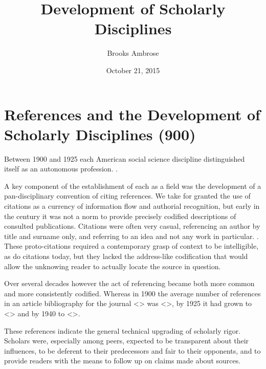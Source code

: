 \documentclass[]{article}
\title{Development of Scholarly Disciplines}
\author{Brooks Ambrose}
\date{October 21, 2015}
\begin{document}
\maketitle

{
\setcounter{tocdepth}{2}
\tableofcontents
}
\section{References and the Development of Scholarly Disciplines
(900)}\label{references-and-the-development-of-scholarly-disciplines-900}

Between 1900 and 1925 each American social science discipline
distinguished itself as an autonomous profession. .

A key component of the establishment of each as a field was the
development of a pan-disciplinary convention of citing references. We
take for granted the use of citations as a currency of information flow
and authorial recognition, but early in the century it was not a norm to
provide precisely codified descriptions of consulted publications.
Citations were often very casual, referencing an author by title and
surname only, and referring to an idea and not any work in particular. .
These proto-citations required a contemporary grasp of context to be
intelligible, as do citations today, but they lacked the address-like
codification that would allow the unknowing reader to actually locate
the source in question.

Over several decades however the act of referencing became both more
common and more consistently codified. Whereas in 1900 the average
number of references in an article bibliography for the journal
\textless{}\textgreater{} was \textless{}\textgreater{}, by 1925 it had
grown to \textless{}\textgreater{} and by 1940 to
\textless{}\textgreater{}.

These references indicate the general technical upgrading of scholarly
rigor. Scholars were, especially among peers, expected to be transparent
about their influences, to be deferent to their predecessors and fair to
their opponents, and to provide readers with the means to follow up on
claims made about sources.
\end{document}

